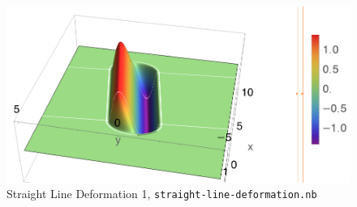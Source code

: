 \documentclass[../main-v2-manifolds.tex]{subfiles}
\begin{document}
\begin{figure}[h!]
    \centering
    \includegraphics[width=1.1\linewidth]{images/straight-line-deformation.png}
    \caption{Straight Line Deformation 1, \texttt{straight-line-deformation.nb}}
    \label{fig:straight-line-deform 1}
\end{figure}
\end{document}
